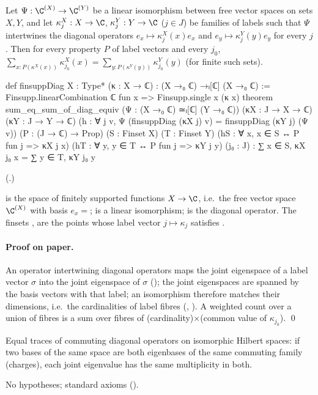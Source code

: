 \begin{theorem}\label{ch19:thm:transfer}
Let $\Psi:\C^{(X)}\to\C^{(Y)}$ be a linear isomorphism between free vector spaces on sets $X,Y$, and let $\kappa^X_j:X\to\C$,
$\kappa^Y_j:Y\to\C$ ($j\in J$) be families of labels such that $\Psi$ intertwines the diagonal operators
$e_x\mapsto\kappa^X_j(x)e_x$ and $e_y\mapsto\kappa^Y_j(y)e_y$ for every $j$.  Then for every property $P$ of label vectors and
every $j_0$, $\sum_{x:P(\kappa^X(x))}\kappa^X_{j_0}(x)=\sum_{y:P(\kappa^Y(y))}\kappa^Y_{j_0}(y)$ (for finite such sets).
\end{theorem}
\begin{leancode}
def finsuppDiag {X : Type*} (κ : X → ℂ) : (X →₀ ℂ) →ₗ[ℂ] (X →₀ ℂ) :=
  Finsupp.linearCombination ℂ fun x => Finsupp.single x (κ x)
theorem sum_eq_sum_of_diag_equiv (Ψ : (X →₀ ℂ) ≃ₗ[ℂ] (Y →₀ ℂ))
    (κX : J → X → ℂ) (κY : J → Y → ℂ)
    (h : ∀ j v, Ψ (finsuppDiag (κX j) v) = finsuppDiag (κY j) (Ψ v))
    (P : (J → ℂ) → Prop) (S : Finset X) (T : Finset Y)
    (hS : ∀ x, x ∈ S ↔ P fun j => κX j x) (hT : ∀ y, y ∈ T ↔ P fun j => κY j y) (j₀ : J) :
    ∑ x ∈ S, κX j₀ x = ∑ y ∈ T, κY j₀ y
\end{leancode}
(.)
\begin{dictionary}
 is the space of finitely supported functions $X\to\C$, i.e.\ the free vector space $\C^{(X)}$ with basis
$e_x=$;  is a linear isomorphism;  is the diagonal operator.  The
finsets ,  are the points whose label vector $j\mapsto\kappa_j$ satisfies .
\end{dictionary}
\paragraph{Proof on paper.}  An operator intertwining diagonal operators maps the joint eigenspace of a label vector
$\sigma$ into the joint eigenspace of $\sigma$ (); the joint eigenspaces are spanned by the
basis vectors with that label; an isomorphism therefore matches their dimensions, i.e.\ the cardinalities of label fibres
(, ).  A weighted count over a union of fibres is a
sum over fibres of (cardinality)$\times$(common value of $\kappa_{j_0}$). \qed
\begin{physics}Equal traces of commuting diagonal operators on isomorphic Hilbert spaces: if two bases of the same space are
both eigenbases of the same commuting family (charges), each joint eigenvalue has the same multiplicity in both.\end{physics}
\begin{status}No hypotheses; standard axioms ().\end{status}

